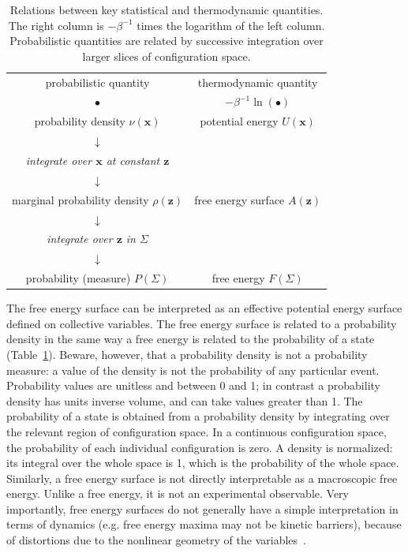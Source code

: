 \documentclass[9pt,review]{livecoms}
\newcommand{\vx}{\mathbf{x}}
\newcommand{\vz}{\mathbf{z}}
\begin{document}
\begin{table}[]
\small
    \centering
\begin{tabular}{c|c}
probabilistic quantity & thermodynamic quantity  \\
$\bullet$ &   $-\beta^{-1} \ln(\bullet)$ \\
\hline
probability density $\nu(\vx)$  & potential energy  $U(\vx)$\\
$\downarrow$ &  \\
\textit{integrate over $\vx$ at constant $\vz$} & \\
$\downarrow$ &  \\
marginal probability density $\rho(\vz)$ & free energy surface $A(\vz)$ \\
$\downarrow$ &  \\
\textit{integrate over $\vz$ in $\Sigma$} & \\
$\downarrow$ &  \\
probability (measure) $P(\Sigma)$  & free energy  $F(\Sigma)$\\
\end{tabular}
    \caption{Relations between key statistical and thermodynamic quantities.
    The right column is $-\beta^{-1}$ times the logarithm of the left column.
    Probabilistic quantities are related by successive integration over larger slices of configuration space.}
    \label{tab:quantities}
\end{table}


The free energy surface can be interpreted as an effective potential energy surface defined on collective variables.
The free energy surface is related to a probability density in the same way a free energy is related to the probability of a state (Table~\ref{tab:quantities}).
Beware, however, that a probability density is not a probability measure: a value of the density is not the probability of any particular event.
Probability values are unitless and between 0 and 1; in contrast a probability density has units inverse volume, and can take values greater than 1. The probability of a state is obtained from a probability density by integrating over the relevant region of configuration space. In a continuous configuration space, the probability of each individual configuration is zero.
A density is normalized: its integral over the whole space is 1, which is the probability of the whole space.
Similarly, a free energy surface is not directly interpretable as a macroscopic free energy. Unlike a free energy, it is not an experimental observable.
Very importantly, free energy surfaces do not generally have a simple interpretation in terms of dynamics (e.g. free energy maxima may not be kinetic barriers), because of distortions due to the nonlinear geometry of the variables~\cite{10.1063/5.0020240,Dietschreit2022}.
\end{document}
